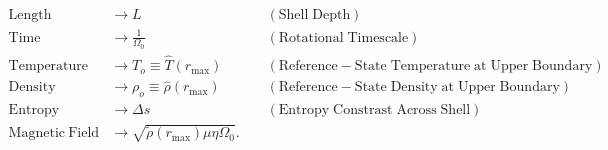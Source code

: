 \documentclass[10pt,letterpaper]{article}
\begin{document}
\begin{align*}
    \mathrm{Length} &\rightarrow L &\;\;\;\; \mathrm{(Shell\; Depth)} \\
    \mathrm{Time} &\rightarrow   \frac{1}{\Omega_0} &\;\;\;\; \mathrm{(Rotational\; Timescale)}\\
    \mathrm{Temperature} &\rightarrow T_o\equiv\hat{T}(r_\mathrm{max})&\;\;\;\; \mathrm{(Reference-State\; Temperature\; at\; Upper\; Boundary)} \\
    \mathrm{Density} &\rightarrow \rho_o\equiv\hat{\rho}(r_\mathrm{max})&\;\;\;\; \mathrm{(Reference-State\; Density\; at\; Upper\; Boundary)} \\
    \mathrm{Entropy} &\rightarrow \Delta{s}&\;\;\;\; \mathrm{(Entropy\; Constrast\; Across\; Shell)} \\
    \mathrm{Magnetic~Field} &\rightarrow \sqrt{\tilde{\rho}(r_\mathrm{max})\mu\eta\Omega_0}.
\end{align*}
\end{document}
